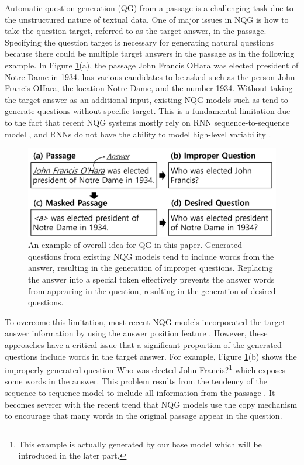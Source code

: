 \documentclass[letterpaper]{article} %
\begin{document}
Automatic question generation (QG) from a passage is a challenging task due to the unstructured nature of textual data. One of major issues in NQG is how to take the question target, referred to as the target answer, in the passage. Specifying the question target is necessary for generating natural questions because there could be multiple target answers in the passage as in the following example. In Figure \ref{fig:replace_a_token}(a), the passage John Francis OHara was elected president of Notre Dame in 1934. has various candidates to be asked such as the person John Francis OHara, the location Notre Dame, and the number 1934. Without taking the target answer as an additional input, existing NQG models such as \cite{du2017learning} tend to generate questions without specific target. This is a fundamental limitation due to the fact that recent NQG systems mostly rely on RNN sequence-to-sequence model \cite{sutskever2014sequence,bahdanau2014neural}, and RNNs do not have the ability to model high-level variability \cite{serban2017hierarchical}.


\begin{figure}[t]
	\includegraphics[width = 0.48 \textwidth]{figure_1_flow2.png}
  	\caption{
    An example of overall idea for QG in this paper. Generated questions from existing NQG models tend to include words from the answer, resulting in the generation of improper questions. Replacing the answer into a special token effectively prevents the answer words from appearing in the question, resulting in the generation of desired questions.
  }

\label{fig:replace_a_token}
\end{figure}


To overcome this limitation, most recent NQG models incorporated the target answer information by using the answer position feature \cite{zhou2017neural,song2018leveraging}. However, these approaches have a critical issue that a significant proportion of the generated questions include words in the target answer. For example, Figure \ref{fig:replace_a_token}(b) shows the improperly generated question Who was elected John Francis?\footnote{This example is actually generated by our base model which will be introduced in the later part.} which exposes some words in the answer. This problem results from the tendency of the sequence-to-sequence model to include all information from the passage \cite{amplayo2018entity}. It becomes severer with the recent trend that NQG models use the copy mechanism \cite{gulcehre2016pointing} to encourage that many words in the original passage appear in the question.
\end{document}
